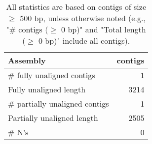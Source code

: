 \documentclass[12pt,a4paper]{article}
\begin{document}
\begin{table}[ht]
\begin{center}
\caption{All statistics are based on contigs of size $\geq$ 500 bp, unless otherwise noted (e.g., "\# contigs ($\geq$ 0 bp)" and "Total length ($\geq$ 0 bp)" include all contigs).}
\begin{tabular}{|l*{1}{|r}|}
\hline
Assembly & contigs \\ \hline
\# fully unaligned contigs & 1 \\ \hline
Fully unaligned length & 3214 \\ \hline
\# partially unaligned contigs & 1 \\ \hline
Partially unaligned length & 2505 \\ \hline
\# N's & 0 \\ \hline
\end{tabular}
\end{center}
\end{table}
\end{document}
